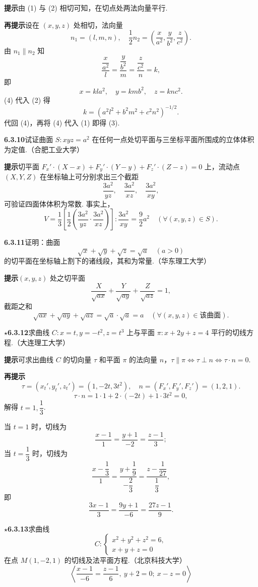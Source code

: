 \documentclass[UTF8, 12pt, fontset=fandol, oneside]{ctexart}
\begin{document}
\noindent\textbf{提示}\quad 由 (1) 与 (2) 相切可知，在切点处两法向量平行.

\noindent\textbf{再提示}\quad 设在 $(x,y,z)$ 处相切，法向量
\[
  n_1=(l,m,n),\quad
  \frac12n_2=\left(\frac{x}{a^2},\frac{y}{b^2},\frac{z}{c^2}\right).
\]
由 $n_1\parallel n_2$ 知
\[
  \frac{\dfrac{x}{a^2}}{l}
  =\frac{\dfrac{y}{b^2}}{m}
  =\frac{\dfrac{z}{c^2}}{n}=k,
\]
即
\[
  x=kla^2,\quad y=kmb^2,\quad z=knc^2. \tag{4}
\]
(4) 代入 (2) 得
\[
  k=(a^2l^2+b^2m^2+c^2n^2)^{-1/2}.
\]
代回 (4)，再将 (4) 代入 (1) 即得 (3).

\noindent\textbf{6.3.10}\quad 试证曲面 $S:xyz=a^2$ 在任何一点处切平面与三坐标平面所围成的立体体积为定值.（合肥工业大学）

\noindent\textbf{提示}\quad 切平面 $F_x'\cdot(X-x)+F_y'\cdot(Y-y)+F_z'\cdot(Z-z)=0$ 上，流动点 $(X,Y,Z)$ 在坐标轴上可分别求出三个截距
\[
  \frac{3a^2}{yz},\quad \frac{3a^2}{xz},\quad \frac{3a^2}{xy},
\]
可验证四面体体积为常数. 事实上，
\[
  V=\frac13\left[\frac12\left(\frac{3a^2}{yz}\cdot\frac{3a^2}{xz}\right)\right]:
  \frac{3a^2}{xy}
  =\frac92a^2\quad(\forall(x,y,z)\in S).
\]

\noindent\textbf{6.3.11}\quad 证明：曲面
\[
  \sqrt{x}+\sqrt{y}+\sqrt{z}=\sqrt{a}\quad(a>0)
\]
的切平面在坐标轴上割下的诸线段，其和为常量.（华东理工大学）

\noindent\textbf{提示}\quad $(x,y,z)$ 处之切平面
\[
  \frac{X}{\sqrt{ax}}+\frac{Y}{\sqrt{ay}}+\frac{Z}{\sqrt{az}}=1,
\]
截距之和
\[
  \sqrt{ax}+\sqrt{ay}+\sqrt{az}
  =\sqrt a\cdot\sqrt a=a\quad(\forall(x,y,z)\in\text{该曲面}).
\]

\noindent\textbf{\ensuremath{\star}6.3.12}\quad 求曲线 $C:x=t,y=-t^2,z=t^3$ 上与平面 $\pi:x+2y+z=4$ 平行的切线方程.（大连理工大学）

\noindent\textbf{提示}\quad 可求出曲线 $C$ 的切向量 $\tau$ 和平面 $\pi$ 的法向量 $n$，$\tau\parallel\pi\Leftrightarrow \tau\perp n\Leftrightarrow \tau\cdot n=0$.

\noindent\textbf{再提示}\quad
\[
  \tau=(x_t',y_t',z_t')=(1,-2t,3t^2),\quad n=(F_x',F_y',F_z')=(1,2,1).
\]
\[
  \tau\cdot n=1\cdot1+2\cdot(-2t)+1\cdot3t^2=0,
\]
解得 $t=1,\dfrac13$.

当 $t=1$ 时，切线为
\[
  \frac{x-1}{1}=\frac{y+1}{-2}=\frac{z-1}{3};
\]
当 $t=\dfrac13$ 时，切线为
\[
  \frac{x-\dfrac13}{1}=\frac{y+\dfrac19}{-\dfrac23}
  =\frac{z-\dfrac1{27}}{\dfrac13},
\]
即
\[
  \frac{3x-1}{3}=\frac{9y+1}{-6}=\frac{27z-1}{9}.
\]

\noindent\textbf{\ensuremath{\star}6.3.13}\quad 求曲线
\[
  C:\begin{cases}
    x^2+y^2+z^2=6,\\
    x+y+z=0
  \end{cases}
\]
在点 $M(1,-2,1)$ 的切线及法平面方程.（北京科技大学）
\[
  \left\langle
  \frac{x-1}{-6}=\frac{z-1}{6},\ y+2=0;\ x-z=0
  \right\rangle
\]
\end{document}
